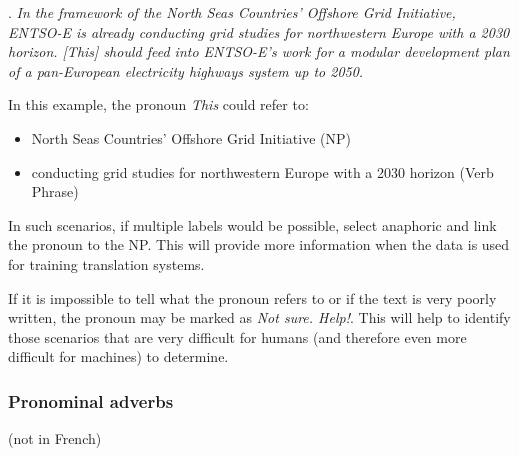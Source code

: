 \documentclass[a4paper]{article}
\begin{document}
\ex.
{\sl In the framework of the North Seas Countries’ Offshore Grid Initiative, ENTSO-E is already conducting grid studies for northwestern Europe with a 2030 horizon. [This] should feed into ENTSO-E's work for a modular development plan of a pan-European electricity highways system up to 2050.}

In this example, the pronoun {\sl This} could refer to:
\begin{itemize}
\item North Seas Countries’ Offshore Grid Initiative (NP)
\item conducting grid studies for northwestern Europe with a 2030 horizon (Verb
Phrase)
\end{itemize}

In such scenarios, if multiple labels would be possible, select anaphoric and link the pronoun to the NP. This will provide more information when the data is used for training translation systems.

If it is impossible to tell what the pronoun refers to or if the text is very poorly written, the pronoun may be marked as {\sl Not sure. Help!}. This will help to identify those scenarios that are very difficult for humans (and therefore even more difficult for machines) to determine.

\subsubsection{Pronominal adverbs}\label{sec:pronadv}

(not in French)

% 
% 
% 
% 
% 
% 
\end{document}
